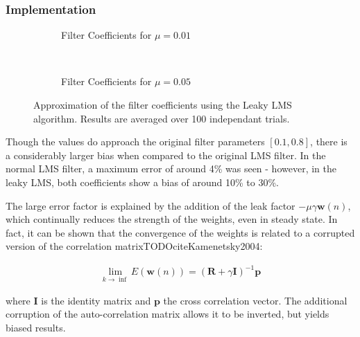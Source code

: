 \documentclass[main.tex]{subfiles}
\begin{document}
\subsubsection{Implementation}

\begin{figure}[H]
	\centering
	\begin{subfigure}[b]{0.45\textwidth}
		\resizebox{\textwidth}{!}{}
		\caption{Filter Coefficients for $\mu = 0.01$}
	\end{subfigure}%
	~ %
	\begin{subfigure}[b]{0.45\textwidth}
		\resizebox{\textwidth}{!}{}
		\caption{Filter Coefficients for $\mu = 0.05$}
	\end{subfigure}
	\caption{Approximation of the filter coefficients using the Leaky LMS algorithm. Results are averaged over 100 independant trials.}
	\label{fig:animals}
\end{figure}



Though the values do approach the original filter parameters $[0.1, 0.8]$, there is a considerably larger bias when compared to the original LMS filter. In the normal LMS filter, a maximum error of around 4\% was seen - however, in the leaky LMS, both coefficients show a bias of around 10\% to 30\%.

The large error factor is explained by the addition of the leak factor $-\mu\gamma\textbf{w}(n)$, which continually reduces the strength of the weights, even in steady state. In fact, it can be shown that the convergence of the weights is related to a corrupted version of the correlation matrixTODOcite{Kamenetsky2004}:

\begin{align*}
\lim_{k \to \inf}E(\textbf{w}(n)) = (\textbf{R} + \gamma \textbf{I})^{-1}\textbf{p}
\end{align*}

where $\textbf{I}$ is the identity matrix and $\textbf{p}$ the cross correlation vector. The additional corruption of the auto-correlation matrix allows it to be inverted, but yields biased results.

\end{document}
